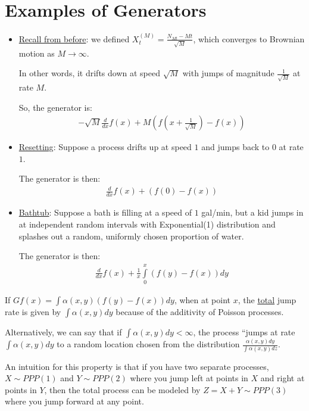 \documentclass[12pt]{article}
\begin{document}
\section{Examples of Generators}
\begin{itemize}
\item \underline{Recall from before}: we defined $X_t^{(M)} = \frac{N_{Mt} - Mt}{\sqrt{M}}$, which converges to Brownian motion as $M\rightarrow\infty$.

In other words, it drifts down at speed $\sqrt{M}$ with jumps of magnitude $\frac{1}{\sqrt{M}}$ at rate $M$.

So, the generator is:
$$\begin{aligned}
-\sqrt{M} \frac{d}{dx} f(x) + M\left( f(x + \frac{1}{\sqrt{M}}) - f(x) \right)
\end{aligned}$$

\item \underline{Resetting}: Suppose a process drifts up at speed $1$ and jumps back to $0$ at rate $1$.

The generator is then:
$$\begin{aligned}
\frac{d}{dx} f(x) + \left( f(0) - f(x) \right)
\end{aligned}$$

\item \underline{Bathtub}: Suppose a bath is filling at a speed of $1$ gal/min, but a kid jumps in at independent random intervals with Exponential(1) distribution and splashes out a random, uniformly chosen proportion of water.

The generator is then:
$$\begin{aligned}
\frac{d}{dx} f(x) + \frac{1}{x} \int\limits_0^x \left( f(y) - f(x) \right) dy
\end{aligned}$$

\end{itemize}

\begin{note} If $G f(x) = \int \alpha(x, y) \left( f(y) - f(x)  \right) dy$, when at point $x$, the \underline{total} jump rate is given by $\int \alpha(x, y) dy$ because of the additivity of Poisson processes.

Alternatively, we can say that if $\int \alpha(x, y)dy < \infty$, the process ``jumps at rate $\int \alpha(x, y)dy$ to a random location chosen from the distribution $\frac{\alpha(x, y) dy}{\int \alpha(x, y) dz}$.

An intuition for this property is that if you have two separate processes, $X\sim PPP(1)$ and $Y\sim PPP(2)$ where you jump left at points in $X$ and right at points in $Y$, then the total process can be modeled by $Z=X+Y\sim PPP(3)$ where you jump forward at any point.
\end{note}
\end{document}
